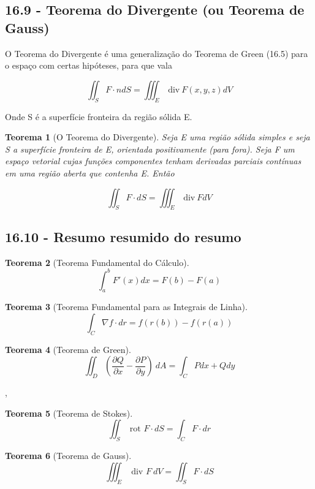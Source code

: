 \documentclass[12pt]{article}
\newtheorem{theorem}{Teorema}[section]
\begin{document}
\subsection*{16.9 - Teorema do Divergente (ou Teorema de Gauss)}
\label{s10}

O Teorema do Divergente é uma generalização do Teorema de Green (16.5) para o espaço com certas hipóteses, para que vala 

$$\iint_S F \cdot n d S = \iiint_E \ \text{div} \ F(x, y, z) d V$$

Onde S é a superfície fronteira da região sólida E.

\begin{theorem}[O Teorema do Divergente]
    Seja E uma região sólida simples e seja S a superfície fronteira de E, orientada positivamente (para fora). Seja F um espaço vetorial cujas funções componentes tenham derivadas parciais contínuas em uma região aberta que contenha E. Então
    
    $$\iint_S F \cdot d S = \iiint_E \ \text{div} \ F d V$$
\end{theorem}

\subsection*{16.10 - Resumo resumido do resumo}
\label{s11}

\begin{theorem}[Teorema Fundamental do Cálculo]
    $$\int_a^b F'(x) d x = F(b) - F(a)$$
\end{theorem}

\begin{theorem}[Teorema Fundamental para as Integrais de Linha]
    $$\int_C \nabla f \cdot d r = f(r(b)) - f(r(a))$$
\end{theorem}

\begin{theorem}[Teorema de Green]
    $$\iint_D \left( \dfrac{\partial Q}{\partial x} - \dfrac{\partial P}{\partial y} \right) \ d A = \int_C P d x + Q d y$$
\end{theorem},

\begin{theorem}[Teorema de Stokes]
    $$\iint_S \text{ rot } F \cdot d S = \int_C F \cdot d r$$
\end{theorem}

\begin{theorem}[Teorema de Gauss]
    $$\iiint_E \text{ div } F \ d V = \iint_S F \cdot d S$$
\end{theorem}
\end{document}

